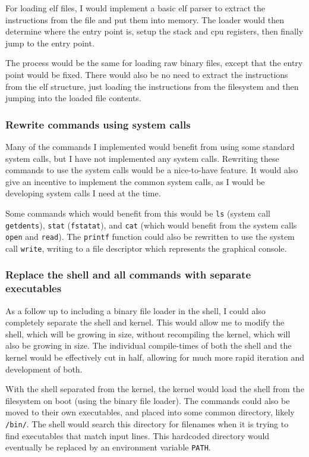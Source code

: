 \documentclass{article}
\begin{document}
For loading \gls{elf} files, I would implement a basic \gls{elf} parser to
extract the instructions from the file and put them into memory. The loader
would then determine where the entry point is, setup the stack and \gls{cpu}
registers, then finally jump to the entry point.

The process would be the same for loading raw binary files, except that the
entry point would be fixed. There would also be no need to extract the
instructions from the \gls{elf} structure, just loading the instructions from
the filesystem and then jumping into the loaded file contents.

\subsubsection{Rewrite commands using system calls}
Many of the commands I implemented would benefit from using some standard
system calls, but I have not implemented any system calls. Rewriting these
commands to use the system calls would be a nice-to-have feature. It would also
give an incentive to implement the common system calls, as I would be
developing system calls I need at the time.

Some commands which would benefit from this would be \texttt{ls} (system call
\texttt{getdents}), \texttt{stat} (\texttt{fstatat}), and \texttt{cat} (which
would benefit from the system calls \texttt{open} and \texttt{read}). The
\texttt{printf} function could also be rewritten to use the system call
\texttt{write}, writing to a file descriptor which represents the graphical
console.

\subsubsection{Replace the shell and all commands with separate executables}
As a follow up to including a binary file loader in the shell, I could also
completely separate the shell and kernel. This would allow me to modify the
shell, which will be growing in size, without recompiling the kernel, which
will also be growing in size. The individual compile-times of both the shell
and the kernel would be effectively cut in half, allowing for much more rapid
iteration and development of both.

With the shell separated from the kernel, the kernel would load the shell from
the filesystem on boot (using the binary file loader). The commands could also
be moved to their own executables, and placed into some common directory,
likely \texttt{/bin/}. The shell would search this directory for filenames when
it is trying to find executables that match input lines. This hardcoded
directory would eventually be replaced by an environment variable
\texttt{PATH}.
\end{document}
